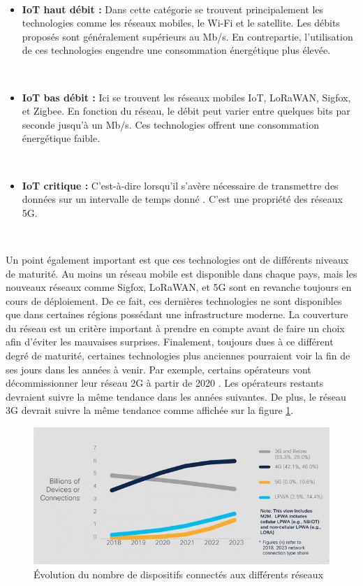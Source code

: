 ~

\begin{itemize}
  \item \textbf{IoT haut débit :} Dans cette catégorie se trouvent principalement les technologies comme les réseaux mobiles, le Wi-Fi et le satellite. Les débits proposés sont généralement supérieurs au Mb/s. En contrepartie, l'utilisation de ces technologies engendre une consommation énergétique plus élevée.

  ~

  \item \textbf{IoT bas débit :} Ici se trouvent les réseaux mobiles IoT, LoRaWAN, Sigfox, et Zigbee. En fonction du réseau, le débit peut varier entre quelques bits par seconde jusqu'à un Mb/s. Ces technologies offrent une consommation énergétique faible.

  ~

  \item \textbf{IoT critique :} C'est-à-dire lorsqu'il s'avère nécessaire de transmettre des données sur un intervalle de temps donné \cite{orange_iot}. C'est une propriété des réseaux 5G.
\end{itemize}

~

\noindent
Un point également important est que ces technologies ont de différents niveaux de maturité. Au moins un réseau mobile est disponible dans chaque pays, mais les nouveaux réseaux comme Sigfox, LoRaWAN, et 5G sont en revanche toujours en cours de déploiement. De ce fait, ces dernières technologies ne sont disponibles que dans certaines régions possédant une infrastructure moderne. La couverture du réseau est un critère important à prendre en compte avant de faire un choix afin d'éviter les mauvaises surprises.
Finalement, toujours dues à ce différent degré de maturité, certaines technologies plus anciennes pourraient voir la fin de ses jours dans les années à venir. Par exemple, certains opérateurs vont décommissionner leur réseau 2G à partir de 2020 \cite{swisscom_2g}. Les opérateurs restants devraient suivre la même tendance dans les années suivantes. De plus, le réseau 3G devrait suivre la même tendance comme affichée sur la figure \ref{fig:evo_network}.

\begin{figure}[ht]
  \includegraphics[width=\textwidth]{img/state_of_the_art/network_evolution.png}
  \caption{Évolution du nombre de dispositifs connectés aux différents réseaux \cite{report_cisco}}
  \label{fig:evo_network}
\end{figure}

